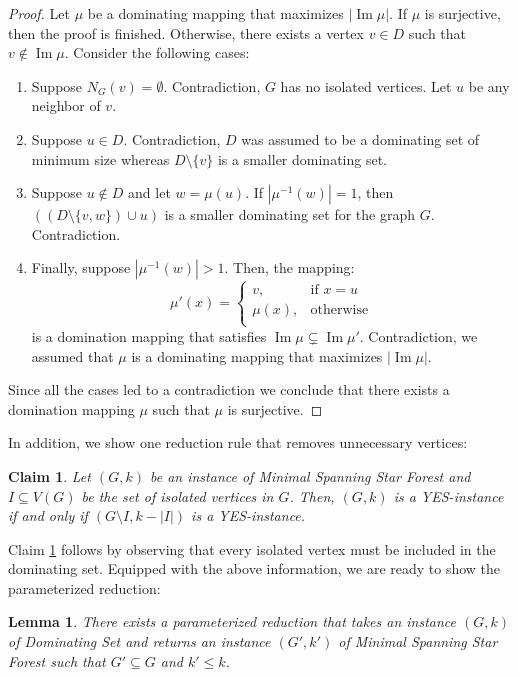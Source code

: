 \documentclass[en]{pracamgr}
\newtheorem{lemma}{Lemma}
\newtheorem{claim}{Claim}
\theoremstyle{definition}
\newcommand{\mssfp}{{\sc Minimal Spanning Star Forest}}
\newcommand{\domsetp}{{\sc Dominating Set}}
\DeclareMathOperator{\Ima}{Im}
\begin{document}
\begin{proof}
	Let $\mu$ be a dominating mapping that maximizes $|\Ima \mu|$. If $\mu$ is surjective, then the proof is finished. Otherwise, there exists a vertex $v \in D$ such that $v \notin \Ima \mu$. Consider the following cases:
	\begin{enumerate}
		\item Suppose $N_G(v) = \emptyset$. Contradiction, $G$ has no isolated vertices. Let $u$ be any neighbor of $v$.
		\item Suppose $u \in D$. Contradiction, $D$ was assumed to be a dominating set of minimum size whereas $D \setminus \{v\}$ is a smaller dominating set.
		\item Suppose $u \notin D$ and let $w = \mu(u)$. If $|\mu^{-1}(w)|=1$, then $((D \setminus \{v,w\}) \cup u)$ is a smaller dominating set for the graph $G$. Contradiction.
		\item Finally, suppose $|\mu^{-1}(w)| > 1$. Then, the mapping:
		\begin{equation*}
			\mu'(x) = \begin{cases}
			v, & \text{if }x = u \\
			\mu(x), &\text{otherwise} \\
			\end{cases}
		\end{equation*}
		is a domination mapping that satisfies $\Ima \mu \subsetneq \Ima \mu'$. Contradiction, we assumed that $\mu$ is a dominating mapping that maximizes $|\Ima \mu|$.
	\end{enumerate}
	
	Since all the cases led to a contradiction we conclude that there exists a domination mapping $\mu$ such that $\mu$ is surjective.  
\end{proof}

In addition, we show one reduction rule that removes unnecessary vertices:

\begin{claim}\label{dom-set-rr}
	Let $(G,k)$ be an instance of \mssfp{} and $I \subseteq V(G)$ be the set of isolated vertices in $G$. Then, $(G,k)$ is a YES-instance if and only if $(G \setminus I, k-|I|)$ is a YES-instance.
\end{claim}

Claim \ref{dom-set-rr} follows by observing that every isolated vertex must be included in the dominating set. Equipped with the above information, we are ready to show the parameterized reduction:

\begin{lemma}\label{dom-ssf reduction}
	There exists a parameterized reduction that takes an instance $(G,k)$ of \domsetp{} and returns an instance $(G',k')$ of \mssfp{} such that $G' \subseteq G$ and $k' \leq k$. 
\end{lemma}
\end{document}
